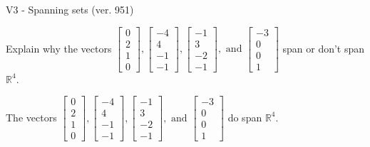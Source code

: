 \begin{exercise}
  \begin{exerciseTitle}V3 - Spanning sets (ver. 951)\end{exerciseTitle}
  \begin{exerciseStatement}
    Explain why the vectors \(\left[\begin{array}{r}
0 \\
2 \\
1 \\
0
\end{array}\right] , \left[\begin{array}{r}
-4 \\
4 \\
-1 \\
-1
\end{array}\right] , \left[\begin{array}{r}
-1 \\
3 \\
-2 \\
-1
\end{array}\right] , \text{ and } \left[\begin{array}{r}
-3 \\
0 \\
0 \\
1
\end{array}\right]\) span or don't span \(\mathbb{R}^4\). 
	


  \end{exerciseStatement}
  \begin{exerciseAnswer}
   The vectors \(\left[\begin{array}{r}
0 \\
2 \\
1 \\
0
\end{array}\right] , \left[\begin{array}{r}
-4 \\
4 \\
-1 \\
-1
\end{array}\right] , \left[\begin{array}{r}
-1 \\
3 \\
-2 \\
-1
\end{array}\right] , \text{ and } \left[\begin{array}{r}
-3 \\
0 \\
0 \\
1
\end{array}\right]\) 
  	 do  
	span \(\mathbb{R}^4\).
  


  \end{exerciseAnswer}
\end{exercise}
